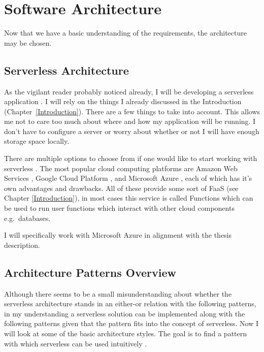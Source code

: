 \chapter{Software Architecture}\label{Ch2}
Now that we have a basic understanding of the requirements, the architecture may be chosen. 

\section{Serverless Architecture}

As the vigilant reader probably noticed already, I will be developing a serverless application \cite{AzurePatterns}. I will rely on the things I already discussed in the Introduction  (Chapter~\ref{Introduction}). There are a few things to take into account.  This allows me not to care too much about where and how my application will be running. I don't have to configure a server or worry about whether or not I will have enough storage space locally.

There are multiple options to choose from if one would like to start working with serverless \cite{ServerlessPlatforms}. The most popular cloud computing platforms are Amazon Web Services \cite{AWS}, Google Cloud Platform \cite{GCP}, and Microsoft Azure \cite{MA}, each of which has it's own advantages and drawbacks. All of these provide some sort of FaaS (see Chapter \ref{Introduction}), in most cases this service is called Functions which can be used to run user functions which interact with other cloud components e.g.\ databases.

I will specifically work with Microsoft Azure in alignment with the thesis description.

\section{Architecture Patterns Overview}
 Although there seems to be a small misunderstanding about whether the serverless architecture stands in an either-or relation with the following patterns, in my understanding a serverless solution can be implemented along with the following patterns given that the pattern fits into the concept of serverless. Now I will look at some of the basic architecture styles. The goal is to find a pattern with which serverless can be used intuitively \cite{AzurePatterns}\cite{SoftArch}\cite{MarkRichards}.

